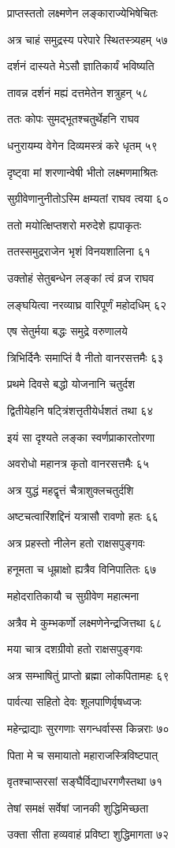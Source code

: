 प्राप्तस्ततो लक्ष्मणेन लङ्काराज्येभिषेचितः

अत्र चाहं समुद्रस्य परेपारे स्थितस्त्र्यहम् ५७

दर्शनं दास्यते मेऽसौ ज्ञातिकार्यं भविष्यति

तावन्न दर्शनं मह्यं दत्तमेतेन शत्रुहन् ५८

ततः कोपः सुमद्भूतश्चतुर्थेहनि राघव

धनुरायम्य वेगेन दिव्यमस्त्रं करे धृतम् ५९

दृष्ट्वा मां शरणान्वेषी भीतो लक्ष्मणमाश्रितः

सुग्रीवेणानुनीतोऽस्मि क्षम्यतां राघव त्वया ६०

ततो मयोत्क्षिप्तशरो मरुदेशे ह्यपाकृतः

ततस्समुद्रराजेन भृशं विनयशालिना ६१

उक्तोहं सेतुबन्धेन लङ्कां त्वं व्रज राघव

लङ्घयित्वा नरव्याघ्र वारिपूर्णं महोदधिम् ६२

एष सेतुर्मया बद्धः समुद्रे वरुणालये

त्रिभिर्दिनैः समाप्तिं वै नीतो वानरसत्तमैः ६३

प्रथमे दिवसे बद्धो योजनानि चतुर्दश

द्वितीयेहनि षट्त्रिंशत्तृतीयेर्धशतं तथा ६४

इयं सा दृश्यते लङ्का स्वर्णप्राकारतोरणा

अवरोधो महानत्र कृतो वानरसत्तमैः ६५

अत्र युद्धं महद्वृत्तं चैत्राशुक्लचतुर्दशि

अष्टचत्वारिंशद्दिनं यत्रासौ रावणो हतः ६६

अत्र प्रहस्तो नीलेन हतो राक्षसपुङ्गवः

हनूमता च धूम्राक्षो ह्यत्रैव विनिपातितः ६७

महोदरातिकायौ च सुग्रीवेण महात्मना

अत्रैव मे कुम्भकर्णो लक्ष्मणेनेन्द्रजित्तथा ६८

मया चात्र दशग्रीवो हतो राक्षसपुङ्गवः

अत्र सम्भाषितुं प्राप्तो ब्रह्मा लोकपितामहः ६९

पार्वत्या सहितो देवः शूलपाणिर्वृषध्वजः

महेन्द्राद्याः सुरगणाः सगन्धर्वास्स किन्नराः ७०

पिता मे च समायातो महाराजस्त्रिविष्टपात्

वृतश्चाप्सरसां सङ्घैर्विद्याधरगणैस्तथा ७१

तेषां समक्षं सर्वेषां जानकी शुद्धिमिच्छता

उक्ता सीता हव्यवाहं प्रविष्टा शुद्धिमागता ७२

